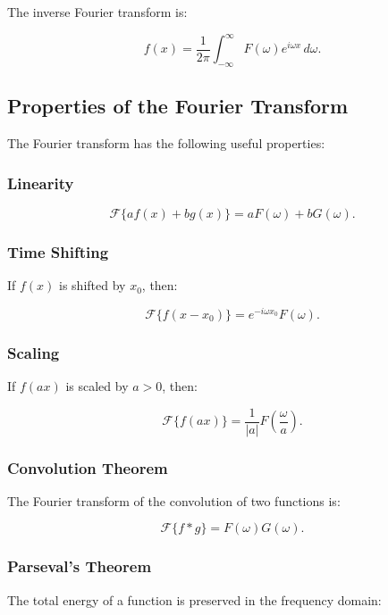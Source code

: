 \documentclass[../Main.tex]{subfiles}
\begin{document}
The inverse Fourier transform is:

\begin{equation}
f(x) = \frac{1}{2\pi} \int_{-\infty}^{\infty} F(\omega) e^{i\omega x} \, d\omega.
\end{equation}

\subsection{Properties of the Fourier Transform}

The Fourier transform has the following useful properties:

\subsubsection{Linearity}
\begin{equation}
\mathcal{F} \{ a f(x) + b g(x) \} = a F(\omega) + b G(\omega).
\end{equation}

\subsubsection{Time Shifting}
If $f(x)$ is shifted by $x_0$, then:

\begin{equation}
\mathcal{F} \{ f(x - x_0) \} = e^{-i\omega x_0} F(\omega).
\end{equation}

\subsubsection{Scaling}
If $f(ax)$ is scaled by $a > 0$, then:

\begin{equation}
\mathcal{F} \{ f(ax) \} = \frac{1}{|a|} F\left(\frac{\omega}{a}\right).
\end{equation}

\subsubsection{Convolution Theorem}
The Fourier transform of the convolution of two functions is:

\begin{equation}
\mathcal{F} \{ f * g \} = F(\omega) G(\omega).
\end{equation}

\subsubsection{Parseval's Theorem}
The total energy of a function is preserved in the frequency domain:
\end{document}
